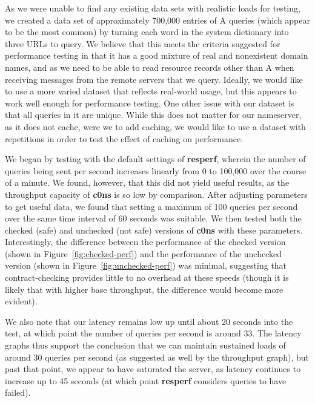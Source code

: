 \documentclass{article}
\newcommand\Kwd[1]{{\sffamily\bfseries{#1}}}
\begin{document}
As we were unable to find any existing data sets with realistic loads for testing, we created a data set of approximately 700,000 entries of A queries (which appear to be the most common) by turning each word in the system dictionary into three URLs to query. We believe that this meets the criteria suggested for performance testing in that it has a good mixture of real and nonexistent domain names, and as we need to be able to read resource records other than A when receiving messages from the remote servers that we query. Ideally, we would like to use a more varied dataset that reflects real-world usage, but this appears to work well enough for performance testing. One other issue with our dataset is that all queries in it are unique. While this does not matter for our nameserver, as it does not cache, were we to add caching, we would like to use a dataset with repetitions in order to test the effect of caching on performance.

We began by testing with the default settings of \Kwd{resperf}, wherein the number of queries being sent per second increases linearly from 0 to 100,000 over the course of a minute. We found, however, that this did not yield useful results, as the throughput capacity of \Kwd{c0ns} is so low by comparison. After adjusting parameters to get useful data, we found that setting a maximum of 100 queries per second over the same time interval of 60 seconds was suitable. We then tested both the checked (safe) and unchecked (not safe) versions of \Kwd{c0ns} with these parameters. Interestingly, the difference between the performance of the checked version (shown in Figure~\ref{fig:checked-perf}) and the performance of the unchecked version (shown in Figure~\ref{fig:unchecked-perf}) was minimal, suggesting that contract-checking provides little to no overhead at these speeds (though it is likely that with higher base throughput, the difference would become more evident).

We also note that our latency remains low up until about 20 seconds into the test, at which point the number of queries per second is around 33. The latency graphs thus support the conclusion that we can maintain sustained loads of around 30 queries per second (as suggested as well by the throughput graph), but past that point, we appear to have saturated the server, as latency continues to increase up to 45 seconds (at which point \Kwd{resperf} considers queries to have failed).
\end{document}
